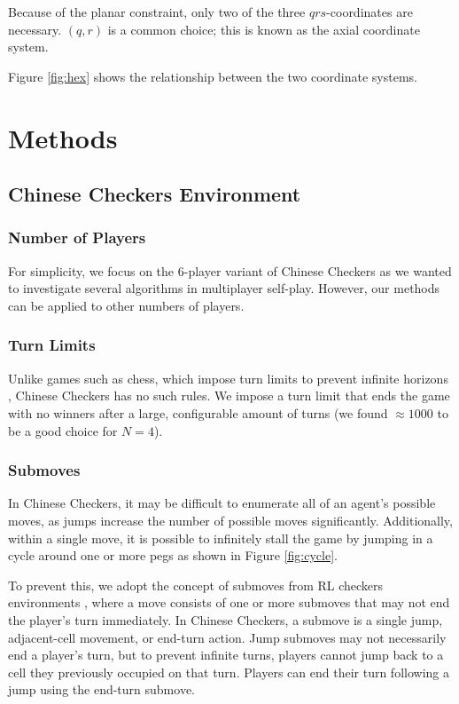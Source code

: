 \documentclass[12pt, a4paper, twocolumn]{article}
\begin{document}
Because of the planar constraint, only two of the three $qrs$-coordinates are necessary. $(q, r)$ is a common choice; this is known as the axial coordinate system.

Figure \ref{fig:hex} shows the relationship between the two coordinate systems.

\section{Methods}

\subsection{Chinese Checkers Environment}

\subsubsection{Number of Players}

For simplicity, we focus on the 6-player variant of Chinese Checkers as we wanted to investigate several algorithms in multiplayer self-play. However, our methods can be applied to other numbers of players.

\subsubsection{Turn Limits}

Unlike games such as chess, which impose turn limits to prevent infinite horizons \cite{ChessTurnLimit}, Chinese Checkers has no such rules. We impose a turn limit that ends the game with no winners after a large, configurable amount of turns (we found $\approx 1000$ to be a good choice for $N=4$).

\subsubsection{Submoves}

In Chinese Checkers, it may be difficult to enumerate all of an agent's possible moves, as jumps increase the number of possible moves significantly. Additionally, within a single move, it is possible to infinitely stall the game by jumping in a cycle around one or more pegs as shown in Figure \ref{fig:cycle}.

To prevent this, we adopt the concept of submoves from RL checkers environments \cite{RLCheckers}, where a move consists of one or more submoves that may not end the player's turn immediately. In Chinese Checkers, a submove is a single jump, adjacent-cell movement, or end-turn action. Jump submoves may not necessarily end a player's turn, but to prevent infinite turns, players cannot jump back to a cell they previously occupied on that turn. Players can end their turn following a jump using the end-turn submove.
\end{document}
